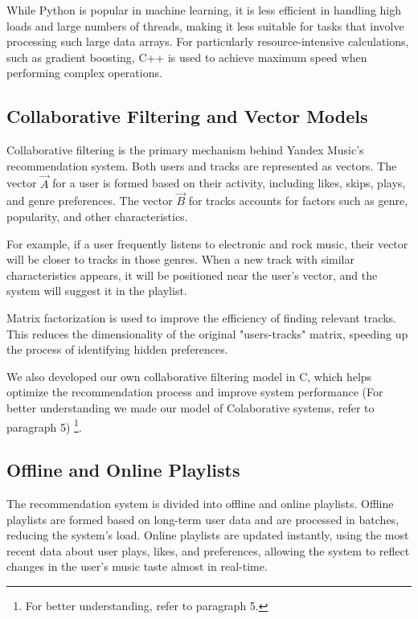 \documentclass[12pt,a4paper]{article}
\begin{document}
While Python is popular in machine learning, it is less efficient in handling high loads and large numbers of threads, making it less suitable for tasks that involve processing such large data arrays. For particularly resource-intensive calculations, such as gradient boosting, C++ is used to achieve maximum speed when performing complex operations.

\subsection{Collaborative Filtering and Vector Models}

Collaborative filtering is the primary mechanism behind Yandex Music’s recommendation system. Both users and tracks are represented as vectors. The vector $\vec{A}$ for a user is formed based on their activity, including likes, skips, plays, and genre preferences. The vector $\vec{B}$ for tracks accounts for factors such as genre, popularity, and other characteristics\citep{Yandex}.

For example, if a user frequently listens to electronic and rock music, their vector will be closer to tracks in those genres. When a new track with similar characteristics appears, it will be positioned near the user’s vector, and the system will suggest it in the playlist.

Matrix factorization is used to improve the efficiency of finding relevant tracks. This reduces the dimensionality of the original "users-tracks" matrix, speeding up the process of identifying hidden preferences.

We also developed our own collaborative filtering model in C, which helps optimize the recommendation process and improve system performance (For better understanding we made our model of Colaborative systems, refer to paragraph 5) \footnote{For better understanding, refer to paragraph 5.}.

\subsection{Offline and Online Playlists}

The recommendation system is divided into offline and online playlists. Offline playlists are formed based on long-term user data and are processed in batches, reducing the system’s load. Online playlists are updated instantly, using the most recent data about user plays, likes, and preferences, allowing the system to reflect changes in the user's music taste almost in real-time\citep{lel}\citep{lol}.
\end{document}
